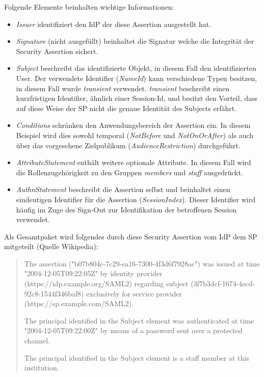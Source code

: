 Folgende Elemente beinhalten wichtige Informationen:

\begin{itemize}
	\item \textit{Issuer} identifiziert den IdP der diese Assertion ausgestellt hat.
	\item \textit{Signature} (nicht ausgefüllt) beinhaltet die Signatur welche die Integrität der Security Assertion sichert.
	\item \textit{Subject} beschreibt das identifizierte Objekt, in diesem Fall den identifizierten User. Der verwendete Identifier (\textit{NameId}) kann verschiedene Typen besitzen, in diesem Fall wurde \textit{transient} verwendet. \textit{transient} beschreibt einen kurzfristigen Identifier, ähnlich einer Session-Id, und besitzt den Vorteil, dass auf diese Weise der SP nicht die genaue Identität des Subjects erfährt.
	\item \textit{Conditions} schränken den Anwendungsbereich der Assertion ein. In diesem Beispiel wird dies sowohl temporal (\textit{NotBefore} und \textit{NotOnOrAfter}) als auch über das vorgesehene Zielpublikum (\textit{AudienceRestriction}) durchgeführt.
	\item \textit{AttributeStatement} enthält weitere optionale Attribute. In diesem Fall wird die Rollenzugehörigkeit zu den Gruppen \textit{members} und \textit{staff} ausgedrückt.
	\item \textit{AuthnStatement} beschreibt die Assertion selbst und beinhaltet einen eindeutigen Identifier für die Assertion (\textit{SessionIndex}). Dieser Identifier wird häufig im Zuge des Sign-Out zur Identifikation der betroffenen Session verwendet.
\end{itemize}

	Als Gesamtpaket wird folgendes durch diese Security Assertion vom IdP dem SP mitgeteilt (Quelle Wikipedia):

\begin{quote}
	The assertion ("b07b804c-7c29-ea16-7300-4f3d6f7928ac") was issued at time "2004-12-05T09:22:05Z" by identity provider (https://idp.example.org/SAML2) regarding subject (3f7b3dcf-1674-4ecd-92c8-1544f346baf8) exclusively for service provider (https://sp.example.com/SAML2).

	The principal identified in the Subject element was authenticated at time "2004-12-05T09:22:00Z" by means of a password sent over a protected channel.

	The principal identified in the Subject element is a staff member at this institution.
\end{quote}

